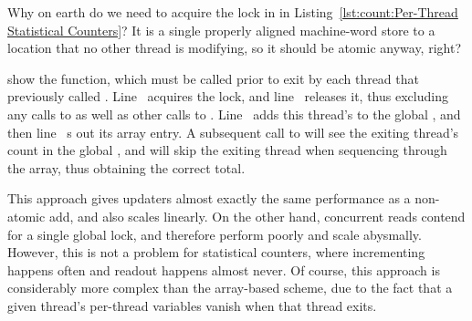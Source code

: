 \QuickQuiz{}
	Why on earth do we need to acquire the lock in
	 in
	Listing~\ref{lst:count:Per-Thread Statistical Counters}?
	It is a single properly aligned machine-word store to a location
	that no other thread is modifying, so it should be atomic anyway,
	right?
 \QuickQuizEnd

\begin{lineref}
 show the 
function, which
must be called prior to exit by each thread that previously called
.
Line~ acquires the lock, and
line~ releases it, thus excluding any
calls to  as well as other calls to
.
Line~ adds this thread's  to the global
,
and then line~ s out its  array entry.
A subsequent call to  will see the exiting thread's
count in the global , and will skip the exiting thread
when sequencing through the  array, thus obtaining
the correct total.
\end{lineref}

This approach gives updaters almost exactly the same performance as
a non-atomic add, and also scales linearly.
On the other hand, concurrent reads contend for a single global lock,
and therefore perform poorly and scale abysmally.
However, this is not a problem for statistical counters, where incrementing
happens often and readout happens almost never.
Of course, this approach is considerably more complex than the
array-based scheme, due to the fact that a given thread's per-thread
variables vanish when that thread exits.


